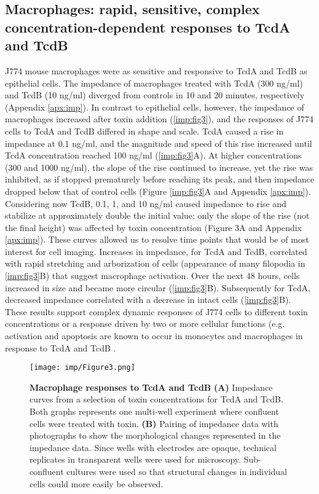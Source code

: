 \subsection{Macrophages: rapid, sensitive, complex concentration-dependent 
              responses to TcdA and TcdB}
J774 mouse macrophages were as sensitive and responsive to 
TcdA and TcdB as epithelial cells. The impedance of 
macrophages treated with TcdA (300 ng/ml) and TcdB (10 ng/ml) 
diverged from controls in 10 and 20 minutes, respectively 
(Appendix \autoref{apx:imp}). In contrast to epithelial cells, however, the 
impedance of macrophages increased after toxin addition (\autoref{imp:fig3}), 
and the responses of J774 cells to TcdA and TcdB differed in 
shape and scale. TcdA caused a rise in impedance at 0.1 ng/ml, 
and the magnitude and speed of this rise increased until 
TcdA concentration reached 100 ng/ml (\autoref{imp:fig3}A). At 
higher concentrations (300 and 1000 ng/ml), the slope of 
the rise continued to increase, yet the rise was inhibited, 
as if stopped prematurely before reaching its peak, and 
then impedance dropped below that of control cells (Figure \autoref{imp:fig3}A
and Appendix \autoref{apx:imp}). Considering now TcdB, 0.1, 1, and 10 ng/ml 
caused impedance to rise and stabilize at approximately double 
the initial value; only the slope of the rise (not the final 
height) was affected by toxin concentration (Figure 3A and 
Appendix \autoref{apx:imp}). These curves allowed us to resolve time 
points that would be of most interest for cell imaging. 
Increases in impedance, for TcdA and TcdB, correlated 
with rapid stretching and arborization of cells (appearance 
of many filopodia in \autoref{imp:fig3}B) that suggest macrophage 
activation. Over the next 48 hours, cells increased in size 
and became more circular (\autoref{imp:fig3}B). Subsequently for TcdA, 
decreased impedance correlated with a decrease in intact 
cells (\autoref{imp:fig3}B). These results support complex 
dynamic responses of J774 cells to different toxin 
concentrations or a response driven by two or more 
cellular functions (e.g. activation and apoptosis are 
known to occur in monocytes and macrophages in response 
to TcdA and TcdB \cite{Solomon:2005dv,Siffert:1993ue,Linevsky:1997wt,MeloFilho:1997ws}.

\begin{figure}[h!]
  \centering
  \texttt{[image: imp/Figure3.png]}
  \caption[Macrophage responses to TcdA and TcdB]{
       \textbf{Macrophage responses to TcdA and TcdB}
       \textbf{(A)} Impedance curves from a selection of toxin 
       concentrations for TcdA and TcdB. Both graphs 
       represents one multi-well experiment where confluent 
       cells were treated with toxin. 
       \textbf{(B)} Pairing of impedance data with photographs 
       to show the morphological changes represented 
       in the impedance data. Since wells with electrodes 
       are opaque, technical replicates in transparent 
       wells were used for microscopy. Sub-confluent 
       cultures were used so that structural changes 
       in individual cells could more easily be observed.
  }
  \label{imp:fig3}
\end{figure}

